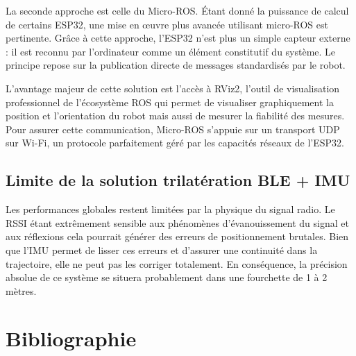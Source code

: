 \documentclass[11pt, a4paper]{article}
\begin{document}
La seconde approche est celle du Micro-ROS. Étant donné la puissance de calcul de certains ESP32, une mise en œuvre plus avancée utilisant micro-ROS est pertinente. Grâce à cette approche, l’ESP32 n’est plus un simple capteur externe : il est reconnu par l'ordinateur comme un élément constitutif du système. Le principe repose sur la publication directe de messages standardisés par le robot.

L’avantage majeur de cette solution est l’accès à RViz2, l’outil de visualisation professionnel de l’écosystème ROS qui permet de visualiser graphiquement la position et l’orientation du robot mais aussi de mesurer la fiabilité des mesures. Pour assurer cette communication, Micro-ROS s’appuie sur un transport UDP sur Wi-Fi, un protocole parfaitement géré par les capacités réseaux de l’ESP32.

\subsection{Limite de la solution trilatération BLE + IMU}

Les performances globales restent limitées par la physique du signal radio. Le RSSI étant extrêmement sensible aux phénomènes d’évanouissement du signal et aux réflexions cela pourrait générer des erreurs de positionnement brutales. Bien que l’IMU permet de lisser ces erreurs et d'assurer une continuité dans la trajectoire, elle ne peut pas les corriger totalement.
En conséquence, la précision absolue de ce système se situera probablement dans une fourchette de 1 à 2 mètres.

\section{Bibliographie}

\printbibliography
\end{document}
